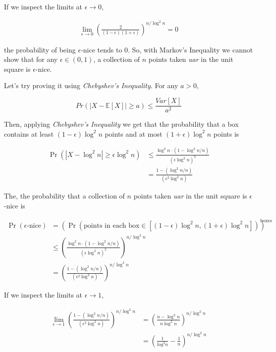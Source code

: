 \documentclass[12pt, a4paper]{article} %
\newcommand\expect[1]{\mathbb{E}[#1]}
\begin{document}
If we inspect the limits at $\epsilon \to 0$,

\begin{align*}
  \lim_{\epsilon \to 0} (\frac{2}{(1 - \epsilon)(1 + \epsilon)})^{n/\log^{2} n} = 0
\end{align*}

the probability of being $\epsilon$-nice tends to 0. So, with Markov's Inequality we cannot show that for any $\epsilon \in (0,1)$, a collection of $n$ points taken \textit{uar} in the unit square is $\epsilon$-nice.

Let's try proving it using \textit{Chebyshev's Inequality}. For any $a > 0$,

\begin{equation*}
  Pr(|X - \expect{X} | \geq a) \leq \frac{Var[X]}{a^2}
\end{equation*}

Then, applying \textit{Chebyshev's Inequality} we get that the probability that a box contains at least $(1-\epsilon) \log^{2}n$ points and at most $(1 + \epsilon)\log^{2}n$ points is

\begin{align*}
  \Pr(|X - \log^{2}n | \geq \epsilon \log^{2}n) &\leq \frac{\log^{2}n \cdot (1 - \log^{2}n/n)}{(\epsilon\log^{2}n)^2} \\
        &= \frac{1 - (\log^{2}n/n)}{(\epsilon^2\log^{2}n)}
\end{align*}

The, the probability that a collection of $n$ points taken \textit{uar} in the unit square is $\epsilon$-nice is

\begin{align*}
  \Pr(\epsilon\text{-nice}) &= (\Pr(\text{points in each box} \in [(1-\epsilon) \log^{2}n, (1 + \epsilon)\log^{2}n]))^{\text{boxes}}\\
                            &\leq (\frac{\log^{2}n \cdot (1 - \log^{2}n/n)}{(\epsilon\log^{2}n)^2})^{n/\log^{2} n} \\
                            &= (\frac{1 - (\log^{2}n/n)}{(\epsilon^2\log^{2}n)})^{n/\log^{2} n}
\end{align*}

If we inspect the limits at $\epsilon \to 1$,

\begin{align*}
  \lim_{\epsilon \to 1} (\frac{1 - (\log^{2}n/n)}{(\epsilon^2\log^{2}n)})^{n/\log^{2} n} &= (\frac{n - \log^{2}n}{n \log^{2}n})^{n/\log^{2} n}\\
  &= (\frac{1}{log^{2}n} - \frac{1}{n})^{n/\log^{2} n}
\end{align*}
\end{document}

